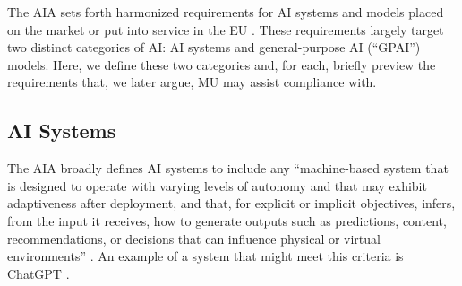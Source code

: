 The AIA sets forth harmonized requirements for AI systems and models placed on the market or put into service in the EU \citep[Art. 1]{european_union_ai_act_2024}. These requirements largely target two distinct categories of AI: AI systems and general-purpose AI (``GPAI'') models. Here, we define these two categories and, for each, briefly preview the requirements that, we later argue, MU may assist compliance with.


\subsection{AI Systems}

The AIA broadly defines AI systems to include any ``machine-based system that is designed to operate with varying levels of autonomy and that may exhibit adaptiveness after deployment, and that, for explicit or implicit objectives, infers, from the input it receives, how to generate outputs such as predictions, content, recommendations, or decisions that can influence physical or virtual environments'' \citep[Art. 3.1]{european_union_ai_act_2024}. An example of a system that might meet this criteria is ChatGPT \citep{fernandez-llorca_interdisciplinary_2024}. 

